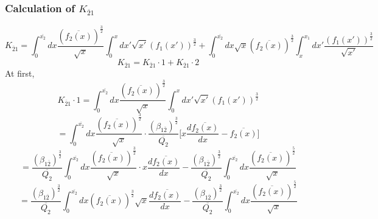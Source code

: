 \documentclass[fleqn, 10pt]{article}
\begin{document}
                                \subsubsection{Calculation of $K_{\overline{2}1}$}
                        \begin{equation}
                            K_{\overline{2}1} = \int^{\overline{x_2}}_0 dx \frac{(\overline{f_2(x)})^\frac{3}{2}}{\sqrt{x}
                            } \int^{x}_0 dx' \sqrt{x'} (f_1(x'))^\frac{3}{2} + \int^{\overline{x_2}}_0 dx \sqrt{x} (\overline{f_2(x)})^\frac{3}{2} \int^{x_1}_{x} dx' \frac{(f_1(x'))^\frac{3}{2}}{\sqrt{x'}}
                            \label{60}
                        \end{equation}
            \begin{equation}
                K_{\overline{2}1} = K_{\overline{2}1}\cdot 1 + K_{\overline{2}1} \cdot 2
                \label{61}
            \end{equation}
            At first,
            \begin{equation}
                K_{\overline{2}1} \cdot 1 = \int^{\overline{x_2}}_0 dx \frac{(\overline{f_2(x)})^\frac{3}{2}}{\sqrt{x}
                            } \int^{x}_0 dx' \sqrt{x'} (f_1(x'))^\frac{3}{2}
                            \label{62}
                \end{equation}
                \begin{equation*}
                    = \int^{\overline{x_2}}_0 dx \frac{(\overline{f_2(x)})^\frac{3}{2}}{\sqrt{x}} \cdot \frac{(\beta_{1\overline{2}})^\frac{3}{2}}{\overline{Q_2}} \biggl[ x \frac{d\overline{f_2(x)}}{dx} - \overline{f_2(x)} \biggr]
                \end{equation*}
                \begin{equation*}
                    = \frac{(\beta_{1\overline{2}})^\frac{3}{2}}{\overline{Q_2}} \int^{\overline{x_2}}_0 dx \frac{(\overline{f_2(x)})^\frac{3}{2}}{\sqrt{x}} \cdot x\frac{d\overline{f_2(x)}}{dx} - \frac{(\beta_{1\overline{2}})^\frac{3}{2}}{\overline{Q_2}} \int^{\overline{x_2}}_0 dx \frac{(\overline{f_2(x)})^\frac{5}{2}}{\sqrt{x}}
                \end{equation*}
                \begin{equation*}
                    = \frac{(\beta_{1\overline{2}})^\frac{3}{2}}{\overline{Q_2}} \int^{\overline{x_2}}_0 dx (\overline{f_2(x)})^\frac{3}{2} \sqrt{x} \frac{d\overline{f_2(x)}}{dx} - \frac{(\beta_{1\overline{2}})^\frac{3}{2}}{\overline{Q_2}} \int^{\overline{x_2}}_0 dx \frac{(\overline{f_2(x)})^\frac{5}{2}}{\sqrt{x}}
                \end{equation*}
\end{document}
